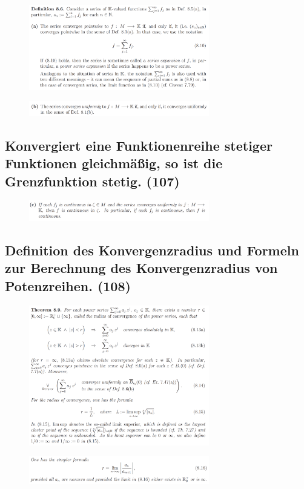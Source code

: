 \begin{figure}[H] \centering
\includegraphics[width=0.7\textwidth]{media/8-15.png}
\end{figure}
\begin{figure}[H] \centering
\includegraphics[width=0.7\textwidth]{media/8-15-2.png}
\end{figure}

\subsection{Konvergiert eine Funktionenreihe stetiger Funktionen gleichmäßig, so ist die Grenzfunktion stetig. (107)}

\begin{figure}[H] \centering
\includegraphics[width=0.7\textwidth]{media/8-16.png}
\end{figure}

\subsection{Definition des Konvergenzradius und Formeln zur Berechnung des Konvergenzradius von Potenzreihen. (108)}

\begin{figure}[H] \centering
\includegraphics[width=0.7\textwidth]{media/8-17.png}
\end{figure}
\begin{figure}[H] \centering
\includegraphics[width=0.7\textwidth]{media/8-17-2.png}
\end{figure}

